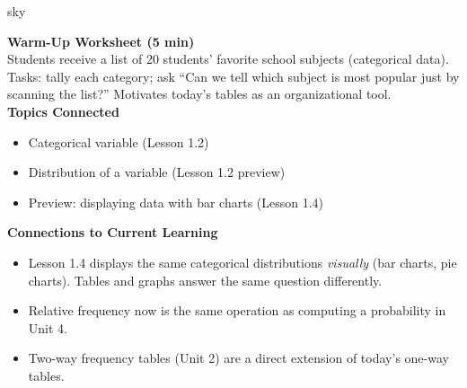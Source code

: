 \documentclass[10pt]{article}
\begin{document}
\begin{skillbox}{sky}
\begin{minipage}[t]{0.48\linewidth}
    \textbf{Warm-Up Worksheet (5 min)}\\
    Students receive a list of 20 students' favorite school subjects (categorical
    data). Tasks: tally each category; ask ``Can we tell which subject is most
    popular just by scanning the list?'' Motivates today's tables as an
    organizational tool.\\[6pt]
    \textbf{Topics Connected}
    \begin{itemize}
        \item[\rule{0.7cm}{0.4pt}] Categorical variable (Lesson 1.2)
        \item[\rule{0.7cm}{0.4pt}] Distribution of a variable (Lesson 1.2 preview)
        \item[\rule{0.7cm}{0.4pt}] Preview: displaying data with bar charts (Lesson 1.4)
    \end{itemize}
\end{minipage}
\hfill
\begin{minipage}[t]{0.48\linewidth}
    \textbf{Connections to Current Learning}
    \begin{itemize}
        \item Lesson 1.4 displays the same categorical distributions \textit{visually}
              (bar charts, pie charts). Tables and graphs answer the same question
              differently.
        \item Relative frequency now is the same operation as computing a probability
              in Unit 4.
        \item Two-way frequency tables (Unit 2) are a direct extension of today's
              one-way tables.
    \end{itemize}
\end{minipage}
\end{skillbox}
\end{document}
